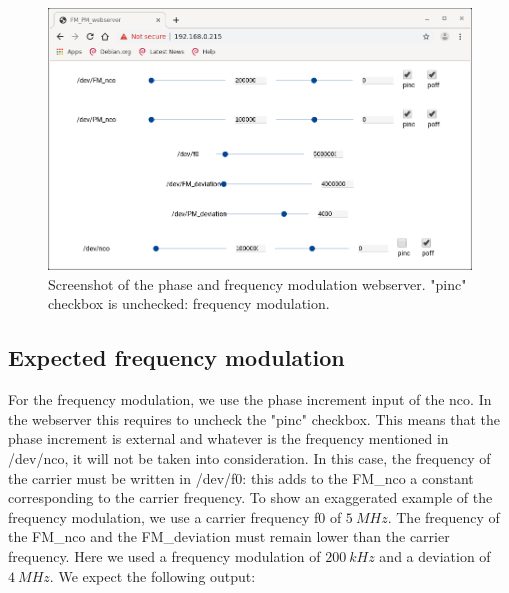 \documentclass[12pt,oneside]{article}
\begin{document}
\begin{figure}[h!tb]
	\begin{center}
		\vspace{0.5cm}
		\includegraphics[width=14cm,trim={0cm 0cm 0cm 0cm}, clip]{webserver/2020-01-07-090526_907x561_scrot.png}
		\caption{Screenshot of the phase and frequency modulation webserver. "pinc" checkbox is unchecked: frequency modulation.}
		\label{fig:FMPMwebserver}
	\end{center}
\end{figure}

\subsection{Expected frequency modulation}

For the frequency modulation, we use the phase increment input of the nco. In the webserver this requires to uncheck the "pinc" checkbox. This means that the phase increment is external and whatever is the frequency mentioned in /dev/nco, it will not be taken into consideration. In this case, the frequency of the carrier must be written in /dev/f0: this adds to the FM\_nco a constant corresponding to the carrier frequency. 
\newline\newline
To show an exaggerated example of the frequency modulation, we use a carrier frequency f0 of $5~MHz$. The frequency of the FM\_nco and the FM\_deviation must remain lower than the carrier frequency. Here we used a frequency modulation of $200~kHz$ and a deviation of $4~MHz$. We expect the following output: 
\end{document}
